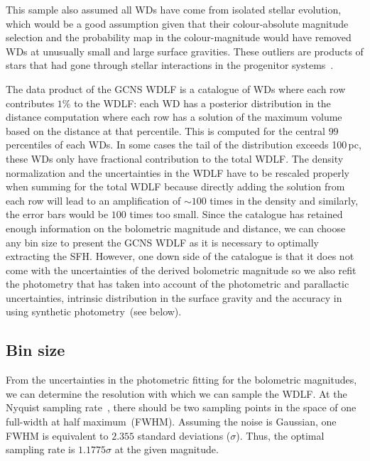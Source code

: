 \documentclass[fleqn,usenatbib]{mnras}
\begin{document}
This sample also assumed all WDs have come from isolated stellar evolution,
which would be a good assumption given that their colour-absolute magnitude
selection and the probability map in the colour-magnitude would have removed
WDs at unusually small and large surface gravities. These outliers are products
of stars that had gone through stellar interactions in the progenitor
systems~\citep[e.g.\ ][]{2013A&ARv..21...59I, 2023arXiv231117145H}.

The data product of the GCNS WDLF is a catalogue of WDs where each row
contributes $1\%$ to the WDLF: each WD has a posterior distribution in the
distance computation where each row has a solution of the maximum volume based
on the distance at that percentile. This is computed for the central $99$
percentiles of each WDs. In some cases the tail of the distribution exceeds
100\,pc, these WDs only have fractional contribution to the total WDLF. The
density normalization and the uncertainties in the WDLF have to be rescaled
properly when summing for the total WDLF because directly adding the solution
from each row will lead to an amplification of $\sim$$100$ times in the density
and similarly, the error bars would be $100$ times too small. Since the
catalogue has retained enough information on the bolometric magnitude and
distance, we can choose any bin size to present the GCNS WDLF as it is necessary
to optimally extracting the SFH. However, one down side of the catalogue is that
it does not come with the uncertainties of the derived bolometric magnitude so
we also refit the photometry that has taken into account of the photometric and
parallactic uncertainties, intrinsic distribution in the surface gravity and
the accuracy in using synthetic photometry~(see below).

\subsection{Bin size}
\label{sec:magnitude_bin_size}
From the uncertainties in the photometric fitting for the bolometric magnitudes,
we can determine the resolution with which we can sample the WDLF. At the Nyquist
sampling rate~\citep{1949IEEEP..37...10S}, there should be two sampling points
in the space of one full-width at half maximum~(FWHM). Assuming the noise is
Gaussian, one FWHM is equivalent to $2.355$ standard deviations ($\sigma$).
Thus, the optimal sampling rate is $1.1775\sigma$ at the given magnitude.
\end{document}

